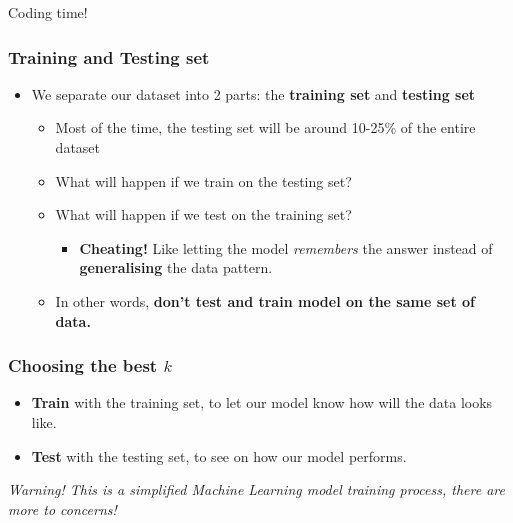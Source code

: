 \documentclass[aspectratio=169]{beamer}
\begin{document}
\begin{frame}
	\Huge{Coding time!}
\end{frame}

\begin{frame}
	\frametitle{Training and Testing set}
	\begin{itemize}
		\item<2-> We separate our dataset into 2 parts: the \textbf{training set} and \textbf{testing set}
		\begin{itemize}
			\item<3-> Most of the time, the testing set will be around 10-25\% of the entire dataset
			\item<4-> What will happen if we train on the testing set?
			\item<5-> What will happen if we test on the training set?
			\begin{itemize}
				\item<6-> \textbf{Cheating!} Like letting the model \textit{remembers} the answer instead of \textbf{generalising} the data pattern.
			\end{itemize}
			\item<7-> In other words, \textbf{don't test and train model on the same set of data.}
		\end{itemize}
	\end{itemize}
\end{frame}

\begin{frame}
	\frametitle{Choosing the best $k$}
	\begin{itemize}
		\item \textbf{Train} with the training set, to let our model know how will the data looks like.
		\item \textbf{Test} with the testing set, to see on how our model performs.
	\end{itemize}
	\small{\textit{Warning! This is a simplified Machine Learning model training process, there are more to concerns!}}
\end{frame}
\end{document}
